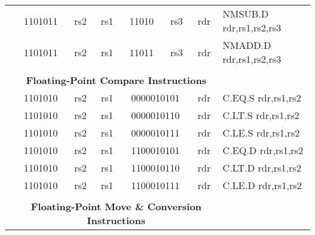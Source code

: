 \begin{table}[p]
\begin{small}
\begin{center}
\begin{tabular}{rcccccccccl}
&
\multicolumn{2}{|c|}{1101011} &
\multicolumn{1}{c|}{rs2} &
\multicolumn{1}{c|}{rs1} &
\multicolumn{2}{c|}{11010} &
\multicolumn{2}{c|}{rs3} &
\multicolumn{1}{c|}{rdr} & NMSUB.D rdr,rs1,rs2,rs3 \\
\cline{2-10}
  

&
\multicolumn{2}{|c|}{1101011} &
\multicolumn{1}{c|}{rs2} &
\multicolumn{1}{c|}{rs1} &
\multicolumn{2}{c|}{11011} &
\multicolumn{2}{c|}{rs3} &
\multicolumn{1}{c|}{rdr} & NMADD.D rdr,rs1,rs2,rs3 \\
\cline{2-10}
  

&
\multicolumn{9}{c}{} & \\
&
\multicolumn{9}{c}{\bf Floating-Point Compare Instructions} & \\
\cline{2-10}
  

&
\multicolumn{2}{|c|}{1101010} &
\multicolumn{1}{c|}{rs2} &
\multicolumn{1}{c|}{rs1} &
\multicolumn{4}{c|}{0000010101} &
\multicolumn{1}{c|}{rdr} & C.EQ.S rdr,rs1,rs2 \\
\cline{2-10}
  

&
\multicolumn{2}{|c|}{1101010} &
\multicolumn{1}{c|}{rs2} &
\multicolumn{1}{c|}{rs1} &
\multicolumn{4}{c|}{0000010110} &
\multicolumn{1}{c|}{rdr} & C.LT.S rdr,rs1,rs2 \\
\cline{2-10}
  

&
\multicolumn{2}{|c|}{1101010} &
\multicolumn{1}{c|}{rs2} &
\multicolumn{1}{c|}{rs1} &
\multicolumn{4}{c|}{0000010111} &
\multicolumn{1}{c|}{rdr} & C.LE.S rdr,rs1,rs2 \\
\cline{2-10}
  

&
\multicolumn{2}{|c|}{1101010} &
\multicolumn{1}{c|}{rs2} &
\multicolumn{1}{c|}{rs1} &
\multicolumn{4}{c|}{1100010101} &
\multicolumn{1}{c|}{rdr} & C.EQ.D rdr,rs1,rs2 \\
\cline{2-10}
  

&
\multicolumn{2}{|c|}{1101010} &
\multicolumn{1}{c|}{rs2} &
\multicolumn{1}{c|}{rs1} &
\multicolumn{4}{c|}{1100010110} &
\multicolumn{1}{c|}{rdr} & C.LT.D rdr,rs1,rs2 \\
\cline{2-10}
  

&
\multicolumn{2}{|c|}{1101010} &
\multicolumn{1}{c|}{rs2} &
\multicolumn{1}{c|}{rs1} &
\multicolumn{4}{c|}{1100010111} &
\multicolumn{1}{c|}{rdr} & C.LE.D rdr,rs1,rs2 \\
\cline{2-10}
  

&
\multicolumn{9}{c}{} & \\
&
\multicolumn{9}{c}{\bf Floating-Point Move \& Conversion Instructions} & \\
\cline{2-10}
  


\end{tabular}
\end{center}
\end{small}
\end{table}

